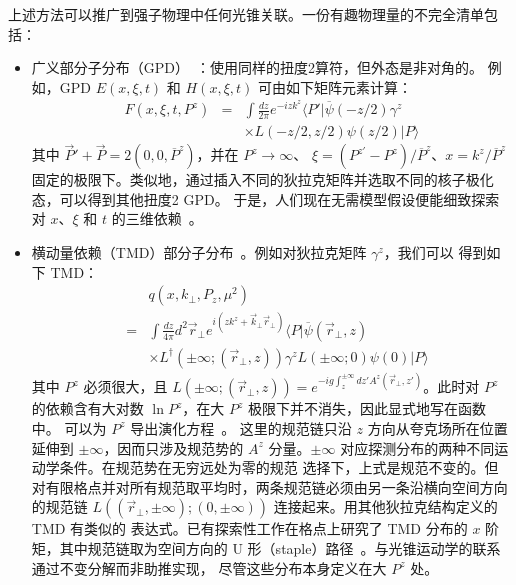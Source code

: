 上述方法可以推广到强子物理中任何光锥关联。一份有趣物理量的不完全清单包括：
\begin{itemize}
\item{广义部分子分布（GPD）~\cite{Ji:1996ek}：使用同样的扭度2算符，但外态是非对角的。
例如，GPD $E(x,\xi, t)$ 和 $H(x, \xi, t)$ 可由如下矩阵元素计算：
\begin{eqnarray}
  F(x, \xi, t, P^z) &=& \int \frac{dz}{2\pi} e^{-izk^z}\langle P'|\overline\psi(-z/2)\gamma^z \\ && \times L(-z/2,z/2)\psi(z/2)|P\rangle \nonumber
\end{eqnarray}
其中 $\vec{P}'+\vec{P}=2(0,0,\overline{P}^z)$，并在 $P^z\rightarrow \infty$、
$\xi= (P^{z'}-P^z)/\overline{P}^z$、$x=k^z/\overline{P}^z$ 固定的极限下。类似地，通过插入不同的狄拉克矩阵并选取不同的核子极化态，可以得到其他扭度2 GPD。
于是，人们现在无需模型假设便能细致探索对 $x$、$\xi$ 和 $t$ 的三维依赖~\cite{Hagler:2003jd}。}

\item{横动量依赖（TMD）部分子分布~\cite{collins}。例如对狄拉克矩阵 $\gamma^z$，我们可以
得到如下 TMD：
\begin{eqnarray}
  && q(x,k_\perp, P_z, \mu^2)\nonumber \\ &=& \int \frac{dz}{4\pi} d^2\vec{r}_\perp e^{i(zk^z+\vec{k}_\perp \vec{r}_\perp)}  \langle P|\overline{\psi}(\vec{r}_\perp,z)
    \\ && \times L^\dagger\left(\pm\infty; (\vec{r}_\perp,z)\right)\gamma^z L(\pm\infty; 0)\psi(0) |P\rangle \nonumber
\end{eqnarray}
其中 $P^z$ 必须很大，且 $L\left(\pm\infty; (\vec{r}_\perp, z)\right) = e^{-ig\int^{\pm\infty}_{z} dz' A^z(\vec{r}_\perp, z')}$。此时对 $P^z$
的依赖含有大对数 $\ln P^z$，在大 $P^z$ 极限下并不消失，因此显式地写在函数中。
可以为 $P^z$ 导出演化方程~\cite{collins}。
这里的规范链只沿 $z$ 方向从夸克场所在位置延伸到 $\pm \infty$，因而只涉及规范势的
$A^z$ 分量。$\pm\infty$ 对应探测分布的两种不同运动学条件。在规范势在无穷远处为零的规范
选择下，上式是规范不变的。但对有限格点并对所有规范取平均时，两条规范链必须由另一条沿横向空间方向的规范链
$L((\vec{r}_\perp, \pm\infty);(0,\pm \infty))$ 连接起来。用其他狄拉克结构定义的 TMD 有类似的
表达式。已有探索性工作在格点上研究了 TMD 分布的 $x$ 阶矩，其中规范链取为空间方向的
U 形（staple）路径~\cite{Musch:2010ka}。与光锥运动学的联系通过不变分解而非助推实现，
尽管这些分布本身定义在大 $P^z$ 处。}


\end{itemize}
